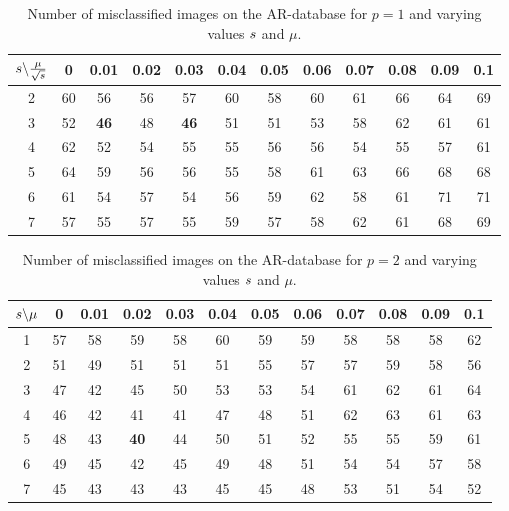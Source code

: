 \documentclass[11pt]{article}
\begin{document}
\begin{table}
\centering
\begin{tabular}{|c|ccccccccccc|}\hline
${s} \backslash \frac{\mu}{\sqrt{s}}$ & 0 & 0.01 & 0.02 & 0.03 & 0.04 & 0.05 & 0.06 & 0.07& 0.08 & 0.09 & 0.1\\ \hline
2  &  60  &  56 &   56  &  57 &   60  &  58 &   60 &   61  &  66 &   64   & 69\\
3  &  52  &  {\bf46}  &  48 &  { \bf 46}  &  51  &  51 &   53  &  58  &  62 &   61  &  61\\
4  &  62  &  52  &  54 &   55  &  55  &  56 &   56 &   54  &  55 &   57  &  61\\
5  &  64 &   59  &  56  &  56  &  55  &  58 &   61 &   63  &  66 &   68  &  68\\
6  &  61 &   54  &  57 &   54 &   56  &  59  &  62  &  58  &  61 &   71  &  71\\
7  &  57  &  55  &  57  &  55  &  59  &  57 &   58  &  62  &  61 &   68  &  69\\ \hline
\end{tabular}
\caption{Number of misclassified images on the AR-database for $p=1$ and varying values ${s}$ and $\mu$.}
\label{tab:l1}
\end{table}

\begin{table}
\centering
\begin{tabular}{|c|ccccccccccc|}\hline
${s} \backslash \mu$ & 0 & 0.01 & 0.02 & 0.03 & 0.04 & 0.05 & 0.06 & 0.07& 0.08 & 0.09 & 0.1\\ \hline
1  &  57  &  58  &  59   & 58  &  60  &  59 &   59  &  58  &  58  &  58  &  62\\
2  &  51  &  49  &  51  &  51  &  51 &   55  &  57  &  57  &  59  &  58  &  56\\
3  &  47  &  42  &  45  &  50  &  53 &   53  &  54  &  61  &  62  &  61  &  64\\
4  &  46  &  42  &  41  &  41  &  47  &  48  &  51  &  62  &  63  &  61  &  63\\
5 &   48  &  43  &  {\bf40}  &  44  &  50  &  51 &   52  &  55  &  55  &  59  &  61\\
6  &  49  &  45  &  42  &  45  &  49  &  48  &  51 &   54  &  54  &  57  &  58\\
7 &   45  &  43  &  43  &  43  &  45  &  45  &  48 &   53  &  51  &  54  &  52\\ \hline
\end{tabular}
\caption{Number of misclassified images on the AR-database for $p=2$ and varying values ${s}$ and $\mu$.}
\label{tab:l2}
\end{table}
\end{document}

